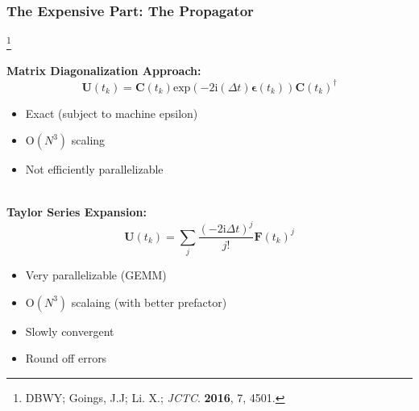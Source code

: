 \documentclass{beamer}
\newcommand{\bpar}[1]{\left( #1 \right)}                  %
\renewcommand{\exp}[1]{\mathrm{exp}\bpar{#1}}
\newcommand\blfootnote[1]{%
  \begingroup
  \renewcommand\thefootnote{}\footnote{#1}%
  \addtocounter{footnote}{-1}%
  \endgroup
}
\begin{document}
\begin{frame}
\frametitle{The Expensive Part: The Propagator}
\blfootnote{DBWY; Goings, J.J; Li. X.; \emph{JCTC}. \textbf{2016}, 7, 4501.}
\textbf{Matrix Diagonalization Approach:}
\begin{equation*}
\mathbf{U}(t_k) = \mathbf{C}(t_k) \exp{-2\mathrm{i}(\Delta t)\boldsymbol{\epsilon}(t_k)} \mathbf{C}(t_k)^\dagger
\end{equation*}
\vspace{-10pt}
\begin{itemize}
  \color{green}
  \item Exact (subject to machine epsilon)
\end{itemize}
\begin{itemize}
  \color{red}
  \item O$(N^3)$ scaling
  \item Not efficiently parallelizable
\end{itemize}
~\\

\textbf{Taylor Series Expansion:}
\begin{equation*}
\mathbf{U}(t_k) = \sum_{j} \frac{(-2\mathrm{i}\Delta t)^j}{j!}\mathbf{F}(t_k)^j
\end{equation*}
\begin{itemize}
  \color{green}
  \item Very parallelizable (GEMM)
  \item O$(N^3)$ scalaing (with better prefactor)
\end{itemize}
\begin{itemize}
  \color{red}
  \item Slowly convergent 
  \item Round off errors
\end{itemize}

\end{frame}
\end{document}
